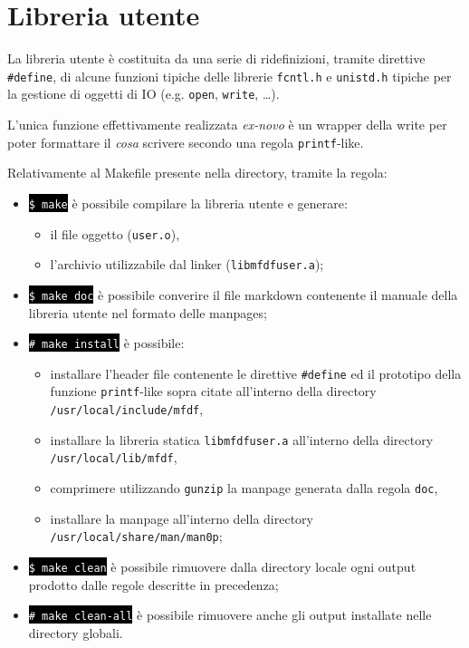 \documentclass{article}
\newcommand{\terminal}[1]{\colorbox{black}{\textcolor{white}{\texttt{#1}}}}
\begin{document}
\section{Libreria utente}
La libreria utente è costituita da una serie di ridefinizioni, tramite direttive \texttt{\#define}, di alcune funzioni tipiche delle librerie \texttt{fcntl.h} e \texttt{unistd.h} tipiche per la gestione di oggetti di IO (e.g. \texttt{open}, \texttt{write}, \dots).

L'unica funzione effettivamente realizzata \textit{ex-novo} è un wrapper della write per poter formattare il \textit{cosa} scrivere secondo una regola \texttt{printf}-like.

Relativamente al Makefile presente nella directory, tramite la regola:
\begin{itemize}
        \item \terminal{\$ make} è possibile compilare la libreria utente e generare:
                \begin{itemize}
                        \item il file oggetto (\texttt{user.o}),
                        \item l'archivio utilizzabile dal linker (\texttt{libmfdfuser.a});
                \end{itemize}
        \item \terminal{\$ make doc} è possibile converire il file markdown contenente il manuale della libreria utente nel formato delle manpages;
        \item \terminal{\# make install} è possibile:
                \begin{itemize}
                        \item installare l'header file contenente le direttive \texttt{\#define} ed il prototipo della funzione \texttt{printf}-like sopra citate all'interno della directory \texttt{/usr/local/include/mfdf},
                        \item installare la libreria statica \texttt{libmfdfuser.a} all'interno della directory \texttt{/usr/local/lib/mfdf},
                        \item comprimere utilizzando \texttt{gunzip} la manpage generata dalla regola \texttt{doc},
                        \item installare la manpage all'interno della directory \texttt{/usr/local/share/man/man0p};
                \end{itemize}
        \item \terminal{\$ make clean} è possibile rimuovere dalla directory locale ogni output prodotto dalle regole descritte in precedenza;
        \item \terminal{\# make clean-all} è possibile rimuovere anche gli output installate nelle directory globali.
\end{itemize}
\end{document}
